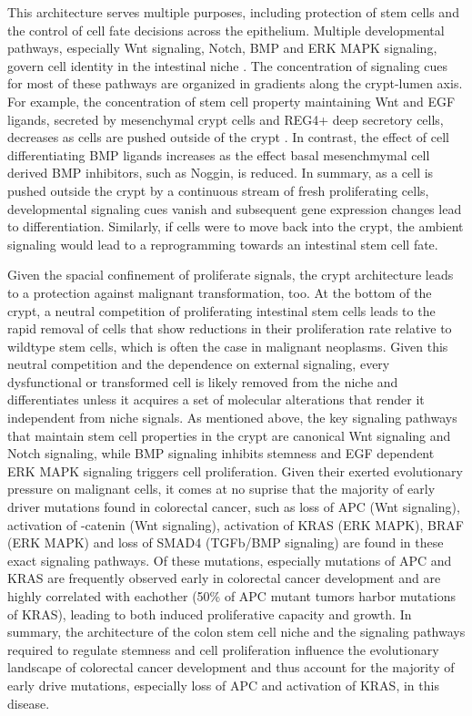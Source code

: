 \begin{flushleft}
This architecture serves multiple purposes, including protection of stem cells and the control of cell fate decisions across the epithelium. Multiple developmental pathways, especially Wnt signaling, Notch, BMP and ERK MAPK signaling, govern cell identity in the intestinal niche \cite{Gehart2019}. The concentration of signaling cues for most of these pathways are organized in gradients along the crypt-lumen axis. For example, the concentration of stem cell property maintaining Wnt and EGF ligands, secreted by mesenchymal crypt cells and REG4+ deep secretory cells, decreases as cells are pushed outside of the crypt  \cite{Sasaki2016}. In contrast, the effect of cell differentiating BMP ligands increases as the effect basal mesenchmymal cell derived BMP inhibitors, such as Noggin, is reduced. In summary, as a cell is pushed outside the crypt by a continuous stream of fresh proliferating cells, developmental signaling cues vanish and subsequent gene expression changes lead to differentiation. Similarly, if cells were to move back into the crypt, the ambient signaling would lead to a reprogramming towards an intestinal stem cell fate. 

Given the spacial confinement of proliferate signals, the crypt architecture leads to a protection against malignant transformation, too. At the bottom of the crypt, a neutral competition of proliferating intestinal stem cells leads to the rapid removal of cells that show reductions in their proliferation rate relative to wildtype stem cells, which is often the case in malignant neoplasms. Given this neutral competition and the dependence on external signaling, every dysfunctional or transformed cell is likely removed from the niche and differentiates unless it acquires a set of molecular alterations that render it independent from niche signals. As mentioned above, the key signaling pathways that maintain stem cell properties in the crypt are canonical Wnt signaling and Notch signaling, while BMP signaling inhibits stemness and EGF dependent ERK MAPK signaling triggers cell proliferation. Given their exerted evolutionary pressure on malignant cells, it comes at no suprise that the majority of early driver mutations found in colorectal cancer, such as loss of APC (Wnt signaling), activation of \textbeta-catenin (Wnt signaling), activation of KRAS (ERK MAPK), BRAF (ERK MAPK) and loss of SMAD4 (TGFb/BMP signaling) are found in these exact signaling pathways. Of these mutations, especially mutations of APC and KRAS are frequently observed early in colorectal cancer development and are highly correlated with eachother (50\% of APC mutant tumors harbor mutations of KRAS), leading to both induced proliferative capacity and growth. In summary, the architecture of the colon stem cell niche and the signaling pathways required to regulate stemness and cell proliferation influence the evolutionary landscape of colorectal cancer development and thus account for the majority of early drive mutations, especially loss of APC and activation of KRAS, in this disease.


\end{flushleft}
